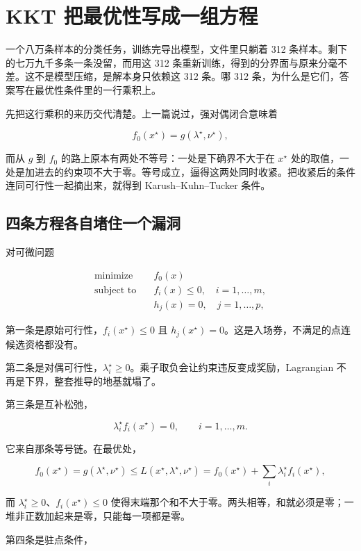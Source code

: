 \section{KKT 把最优性写成一组方程}
\label{sec:09-Convex-Optimization/05-Duality/03}

一个八万条样本的分类任务，训练完导出模型，文件里只躺着 312 条样本。剩下的七万九千多条一条没留，而用这 312 条重新训练，得到的分界面与原来分毫不差。这不是模型压缩，是解本身只依赖这 312 条。哪 312 条，为什么是它们，答案写在最优性条件里的一行乘积上。

先把这行乘积的来历交代清楚。上一篇说过，强对偶闭合意味着

\[
f_0(x^\star)=g(\lambda^\star,\nu^\star),
\]

而从 \(g\) 到 \(f_0\) 的路上原本有两处不等号：一处是下确界不大于在 \(x^\star\) 处的取值，一处是加进去的约束项不大于零。等号成立，逼得这两处同时收紧。把收紧后的条件连同可行性一起摘出来，就得到 Karush--Kuhn--Tucker 条件。

\subsection{四条方程各自堵住一个漏洞}

对可微问题

\[
\begin{aligned}
\text{minimize}\quad&f_0(x)\\
\text{subject to}\quad&f_i(x)\le0,\quad i=1,\ldots,m,\\
&h_j(x)=0,\quad j=1,\ldots,p,
\end{aligned}
\]

第一条是原始可行性，\(f_i(x^\star)\le0\) 且 \(h_j(x^\star)=0\)。这是入场券，不满足的点连候选资格都没有。

第二条是对偶可行性，\(\lambda_i^\star\ge0\)。乘子取负会让约束违反变成奖励，Lagrangian 不再是下界，整套推导的地基就塌了。

第三条是互补松弛，

\[
\lambda_i^\star f_i(x^\star)=0,\qquad i=1,\ldots,m.
\]

它来自那条等号链。在最优处，

\[
f_0(x^\star)=g(\lambda^\star,\nu^\star)\le L(x^\star,\lambda^\star,\nu^\star)=f_0(x^\star)+\sum_i\lambda_i^\star f_i(x^\star),
\]

而 \(\lambda_i^\star\ge0\)、\(f_i(x^\star)\le0\) 使得末端那个和不大于零。两头相等，和就必须是零；一堆非正数加起来是零，只能每一项都是零。

第四条是驻点条件，

